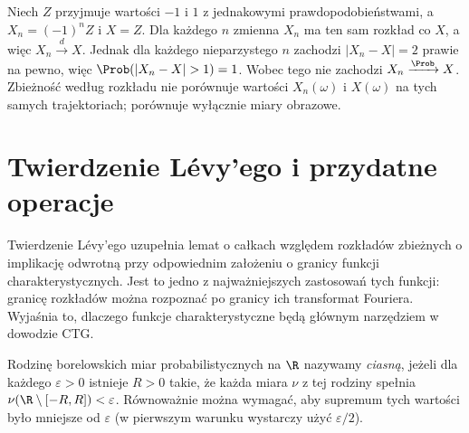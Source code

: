 \begin{przyklad}
Niech $Z$ przyjmuje wartości $-1$ i $1$ z jednakowymi
prawdopodobieństwami, a $X_n=(-1)^nZ$ i $X=Z$.
Dla każdego $n$ zmienna $X_n$ ma ten sam rozkład co $X$,
a więc $X_n\xrightarrow{d}X$. Jednak dla każdego
nieparzystego $n$ zachodzi $|X_n-X|=2$ prawie na pewno,
więc $\Prob(|X_n-X|>1)=1$.
Wobec tego nie zachodzi $X_n\xrightarrow{\Prob}X$.
Zbieżność według rozkładu nie porównuje wartości
$X_n(\omega)$ i $X(\omega)$ na tych samych trajektoriach;
porównuje wyłącznie miary obrazowe.
\end{przyklad}

\section{Twierdzenie Lévy'ego i przydatne operacje}

Twierdzenie Lévy'ego uzupełnia lemat o całkach względem
rozkładów zbieżnych o implikację odwrotną przy odpowiednim
założeniu o granicy funkcji charakterystycznych.
Jest to jedno z najważniejszych zastosowań tych funkcji:
granicę rozkładów można rozpoznać po granicy ich
transformat Fouriera. Wyjaśnia to, dlaczego funkcje
charakterystyczne będą głównym narzędziem w dowodzie CTG.

Rodzinę borelowskich miar probabilistycznych na $\R$
nazywamy \emph{ciasną}, jeżeli dla każdego $\varepsilon>0$
istnieje $R>0$ takie, że każda miara $\nu$ z tej rodziny
spełnia $\nu(\R\setminus[-R,R])<\varepsilon$.
Równoważnie można wymagać, aby supremum tych wartości
było mniejsze od $\varepsilon$ (w pierwszym warunku
wystarczy użyć $\varepsilon/2$).

